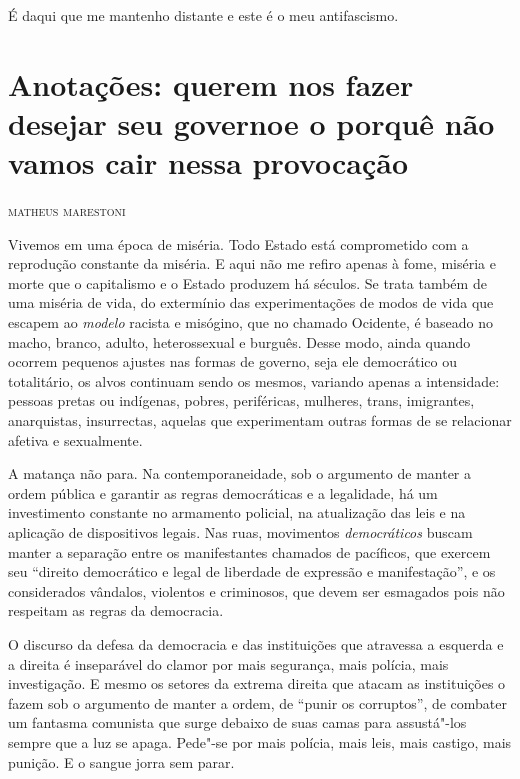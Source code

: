 É daqui que me mantenho distante e este é o meu antifascismo.



\chapter[Anotações: querem nos fazer desejar seu governo\\ e o porquê não vamos cair nessa provocação \medskip]{Anotações: querem nos fazer desejar seu governo\break e o porquê não vamos cair nessa provocação}

\hfill{}\textsc{matheus marestoni}

\bigskip

Vivemos em uma época de miséria. Todo Estado está comprometido com a
reprodução constante da miséria. E aqui não me refiro apenas à fome,
miséria e morte que o capitalismo e o Estado produzem há séculos. Se
trata também de uma miséria de vida, do extermínio das experimentações
de modos de vida que escapem ao \emph{modelo} racista e misógino, que no
chamado Ocidente, é baseado no macho, branco, adulto, heterossexual e
burguês. Desse modo, ainda quando ocorrem pequenos ajustes nas formas de
governo, seja ele democrático ou totalitário, os alvos continuam sendo
os mesmos, variando apenas a intensidade: pessoas pretas ou indígenas,
pobres, periféricas, mulheres, trans, imigrantes, anarquistas,
insurrectas, aquelas que experimentam outras formas de se relacionar
afetiva e sexualmente.

A matança não para. Na contemporaneidade, sob o argumento de manter a
ordem pública e garantir as regras democráticas e a legalidade, há um
investimento constante no armamento policial, na atualização das leis e
na aplicação de dispositivos legais. Nas ruas, movimentos
\emph{democráticos} buscam manter a separação entre os manifestantes
chamados de pacíficos, que exercem seu ``direito democrático e legal de
liberdade de expressão e manifestação'', e os considerados vândalos,
violentos e criminosos, que devem ser esmagados pois não respeitam as
regras da democracia.

O discurso da defesa da democracia e das instituições que atravessa a
esquerda e a direita é inseparável do clamor por mais segurança, mais
polícia, mais investigação. E mesmo os setores da extrema direita que
atacam as instituições o fazem sob o argumento de manter a ordem, de
``punir os corruptos'', de combater um fantasma comunista que surge
debaixo de suas camas para assustá"-los sempre que a luz se apaga.
Pede"-se por mais polícia, mais leis, mais castigo, mais punição. E o
sangue jorra sem parar.

